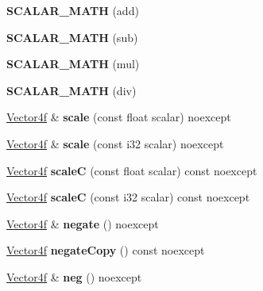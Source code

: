 \begin{DoxyCompactItemize}
{\bfseries S\+C\+A\+L\+A\+R\+\_\+\+M\+A\+TH} (add)
\item 
\mbox{\label{class_vector4f_a3e5593a42a3ddd8c673fb2751f29a2e3}} 
{\bfseries S\+C\+A\+L\+A\+R\+\_\+\+M\+A\+TH} (sub)
\item 
\mbox{\label{class_vector4f_a32f2a607f8c23a17b91e6e7fe3a9404c}} 
{\bfseries S\+C\+A\+L\+A\+R\+\_\+\+M\+A\+TH} (mul)
\item 
\mbox{\label{class_vector4f_a806cae9d831aa838bcef8e5350df1276}} 
{\bfseries S\+C\+A\+L\+A\+R\+\_\+\+M\+A\+TH} (div)
\item 
\mbox{\label{class_vector4f_aab512d52f67a6e90c39e44d2c90fb5e3}} 
\mbox{\hyperlink{class_vector4f}{Vector4f}} \& {\bfseries scale} (const float scalar) noexcept
\item 
\mbox{\label{class_vector4f_a780668dfe5b72d1361c882f3352cd72d}} 
\mbox{\hyperlink{class_vector4f}{Vector4f}} \& {\bfseries scale} (const i32 scalar) noexcept
\item 
\mbox{\label{class_vector4f_a8c2f1810285a0625a94037f17a3ae2c4}} 
\mbox{\hyperlink{class_vector4f}{Vector4f}} {\bfseries scaleC} (const float scalar) const noexcept
\item 
\mbox{\label{class_vector4f_a1939ecd8f2c4f7f4daf873a700c3c3d5}} 
\mbox{\hyperlink{class_vector4f}{Vector4f}} {\bfseries scaleC} (const i32 scalar) const noexcept
\item 
\mbox{\label{class_vector4f_a166b815a10aaa83f0fa7a3ae9afcb112}} 
\mbox{\hyperlink{class_vector4f}{Vector4f}} \& {\bfseries negate} () noexcept
\item 
\mbox{\label{class_vector4f_aa075f093296e7dca17bfcc0c5186b896}} 
\mbox{\hyperlink{class_vector4f}{Vector4f}} {\bfseries negate\+Copy} () const noexcept
\item 
\mbox{\label{class_vector4f_a36dcc655bcc9b6ce3fea7e79b53434a2}} 
\mbox{\hyperlink{class_vector4f}{Vector4f}} \& {\bfseries neg} () noexcept
\item 

\end{DoxyCompactItemize}
